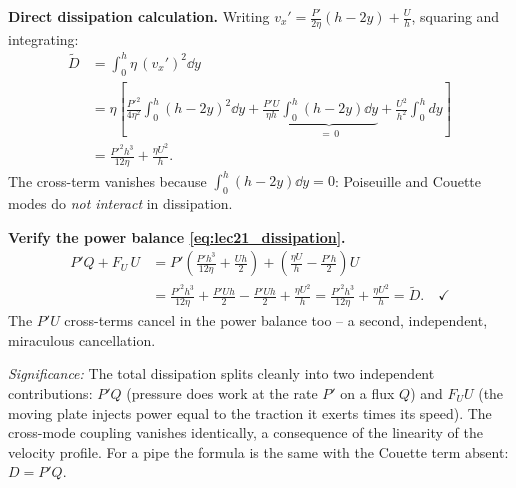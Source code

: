 \documentclass[../main.tex]{subfiles}
\begin{document}
\textbf{Direct dissipation calculation.} Writing $v_x'=\tfrac{P'}{2\eta}(h-2y)+\tfrac{U}{h}$, squaring and integrating:
\begin{align}
  \tilde{D}&=\int_0^h\eta\,(v_x')^2\dd{y} \nonumber\\
  &=\eta\left[
      \frac{P'^2}{4\eta^2}\int_0^h(h-2y)^2\dd{y}
     +\frac{P'U}{\eta h}\underbrace{\int_0^h(h-2y)\dd{y}}_{=\,0}
     +\frac{U^2}{h^2}\int_0^h dy
    \right] \nonumber\\
  &=\frac{P'^2 h^3}{12\eta}+\frac{\eta U^2}{h}.
  \label{eq:lec21_diss_direct}
\end{align}
The cross-term vanishes because $\int_0^h(h-2y)\dd{y}=0$: Poiseuille and Couette modes do \emph{not interact} in dissipation.

\textbf{Verify the power balance \eqref{eq:lec21_dissipation}.}
\begin{align}
  P'Q+F_U\,U
  &=P'\!\left(\frac{P'h^3}{12\eta}+\frac{Uh}{2}\right)
   +\left(\frac{\eta U}{h}-\frac{P'h}{2}\right)U \nonumber\\
  &=\frac{P'^2h^3}{12\eta}+\frac{P'Uh}{2}-\frac{P'Uh}{2}+\frac{\eta U^2}{h}
   =\frac{P'^2h^3}{12\eta}+\frac{\eta U^2}{h}=\tilde{D}.\quad\checkmark
  \label{eq:lec21_powercheck}
\end{align}
The $P'U$ cross-terms cancel in the power balance too -- a second, independent, miraculous cancellation.

\textit{Significance:} The total dissipation splits cleanly into two independent contributions: $P'Q$ (pressure does work at the rate $P'$ on a flux $Q$) and $F_U U$ (the moving plate injects power equal to the traction it exerts times its speed). The cross-mode coupling vanishes identically, a consequence of the linearity of the velocity profile. For a pipe the formula is the same with the Couette term absent: $D=P'Q$.
\end{document}
